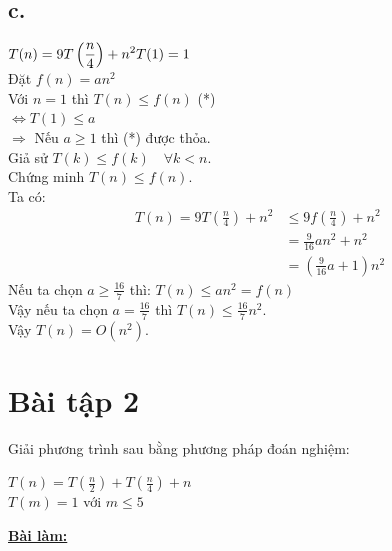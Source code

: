 \documentclass[12pt, a4paper, fleqn]{article}
\begin{document}
		\subsection*{c.}
			$\displaystyle
			T(n) = 9T\left( \frac{n}{4} \right) + n^2\\
			T(1) = 1$\\
			
			Đặt $f(n) = an^2$\\
			Với $n = 1$ thì $T(n) \leq f(n)$ \hspace{100pt} (*)\\
			$\Leftrightarrow  T(1) \leq a$\\
			$\Rightarrow$ Nếu $a \geq 1$ thì (*) được thỏa.\\
			Giả sử $T(k) \leq f(k) \quad \forall k < n$.\\
			Chứng minh $T(n) \leq f(n)$.\\
			Ta có:
			\begin{align*}
			T(n) = 9T\left( \frac{n}{4} \right) + n^2 &\leq 9f\left( \frac{n}{4}\right) + n^2\\
			&= \frac{9}{16} an^2 + n^2\\
			&= \left( \frac{9}{16} a + 1 \right) n^2
			\end{align*}
			Nếu ta chọn $a \geq \displaystyle \frac{16}{7}$ thì: $T(n) \leq an^2 = f(n)$\\
			Vậy nếu ta chọn $a = \displaystyle \frac{16}{7}$ thì $T(n) \leq \displaystyle \frac{16}{7}n^2$.\\
			Vậy $T(n) = O(n^2)$.
	
	
	\clearpage
	
	\section*{Bài tập 2}
		Giải phương trình sau bằng phương pháp đoán nghiệm:
		
		$\displaystyle
		T(n) = T\left( \frac{n}{2} \right) + T\left( \frac{n}{4} \right) + n$\\
		$T(m) = 1$ với $m \leq 5$
		
		\begin{center}
			\textbf{\underline{Bài làm:}}
		\end{center}
	
\end{document}
